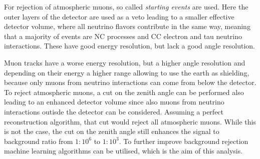 For rejection of atmospheric muons, so called \textit{starting events} are used. Here the outer layers of the detector are used as a veto leading to a smaller effective detector volume, where all neutrino flavors contribute in the same way, meaning that a majority of events are NC processes and CC electron and tau neutrino interactions. These have good energy resolution, but lack a good angle resolution.

Muon tracks have a worse energy resolution, but a higher angle resolution and depending on their energy a higher range allowing to use the earth as shielding, because only muons from neutrino interactions can come from below the detector. To reject atmospheric muons, a cut on the zenith angle can be performed also leading to an enhanced detector volume since also muons from neutrino interactions outisde the detector can be considered. Assuming a perfect reconstruction algorithm, that cut would reject all atmospheric muons. While this is not the case, the cut on the zenith angle still enhances the signal to background ratio from $1 : 10^6$ to $1 : 10^3$. To further improve background rejection machine learning algorithms can be utilised, which is the aim of this analysis.
